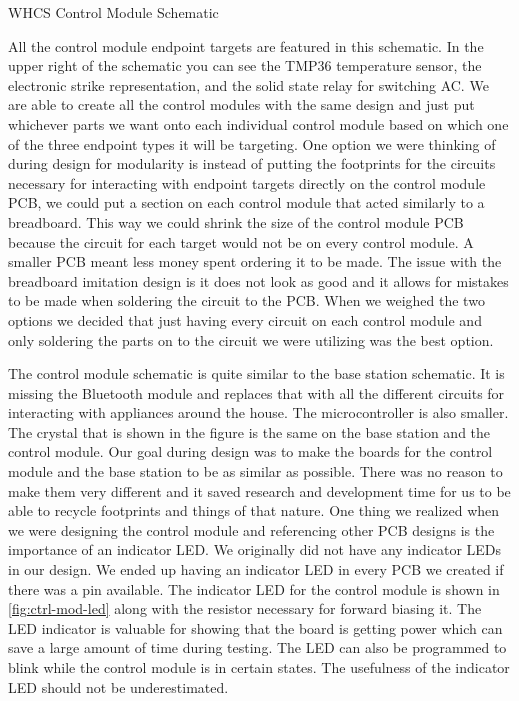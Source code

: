 {WHCS Control Module Schematic}

All the control module endpoint targets are featured in this
schematic. In the upper right of the schematic you can see the TMP36
temperature sensor, the electronic strike representation, and the solid state
relay for switching AC. We are able to create all the control modules
with the same design and just put whichever parts we want onto each
individual control module based on which one of the three endpoint types it
will be targeting. One option we were thinking of during design for
modularity is instead of putting the footprints for the circuits necessary
for interacting with endpoint targets directly on the control module PCB, we
could put a section on each control module that acted similarly to a
breadboard. This way we could shrink the size of the control module PCB
because the circuit for each target would not be on every control module. A
smaller PCB meant less money spent ordering it to be made. The issue with the
breadboard imitation design is it does not look as good and it allows for
mistakes to be made when soldering the circuit to the PCB. When we weighed
the two options we decided that just having every circuit on each control
module and only soldering the parts on to the circuit we were utilizing was the
best option.

The control module schematic is quite similar to the base
station schematic. It is missing the Bluetooth module and replaces that with
all the different circuits for interacting with appliances around the house.
The microcontroller is also smaller. The crystal that is shown in the figure
is the same on the base station and the control module. Our goal during
design was to make the boards for the control module and the base station to
be as similar as possible.  There was no reason to make them very different
and it saved research and development time for us to be able to recycle
footprints and things of that nature. One thing we realized when we were
designing the control module and referencing other PCB designs is the
importance of an indicator LED. We originally did not have any indicator LEDs
in our design.  We ended up having an indicator LED in every PCB we created if
there was a pin available. The indicator LED for the control module is shown
in \autoref{fig:ctrl-mod-led} along with the resistor necessary for forward biasing
it. The LED indicator is valuable for showing that the board is getting power
which can save a large amount of time during testing. The LED can also be
programmed to blink while the control module is in certain states. The
usefulness of the indicator LED should not be underestimated.

